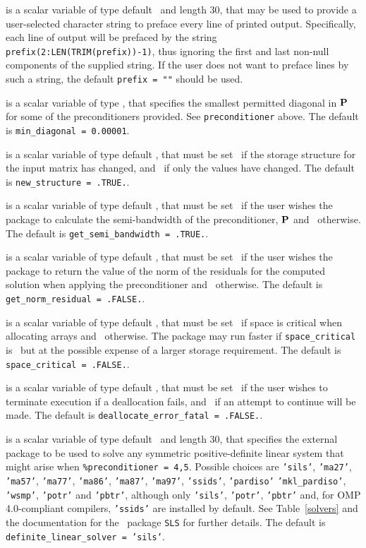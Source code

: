 \documentclass{galahad}
\begin{document}
\begin{description}
 is a scalar variable of type default \character\
and length 30, that may be used to provide a user-selected
character string to preface every line of printed output.
Specifically, each line of output will be prefaced by the string
{\tt prefix(2:LEN(TRIM(prefix))-1)},
thus ignoring the first and last non-null components of the
supplied string. If the user does not want to preface lines by such
a string, the default {\tt prefix = ""} should be used.

 is a scalar variable of type \realdp,
that specifies the smallest permitted diagonal in ${\mathbf{P}}$ for some
of the preconditioners provided. See {\tt preconditioner} above.
The default is {\tt min\_diagonal = 0.00001}.

 is a scalar variable of type default \logical,
that must be set \true\ if the storage structure for the input matrix has
changed, and \false\ if only the values have changed.
The default is {\tt new\_structure = .TRUE.}.

 is a scalar variable of type default \logical,
that must be set \true\ if the user wishes the package to calculate
the semi-bandwidth of the preconditioner, ${\mathbf{P}}$
and  \false\ otherwise.
The default is {\tt get\_semi\_bandwidth = .TRUE.}.

 is a scalar variable of type default \logical,
that must be set \true\ if the user wishes the package to return
the value of the norm of the residuals for the computed solution
when applying the preconditioner and  \false\ otherwise.
The default is {\tt get\_norm\_residual = .FALSE.}.

 is a scalar variable of type default \logical,
that must be set \true\ if space is critical when allocating arrays
and  \false\ otherwise. The package may run faster if
{\tt space\_critical} is \false\ but at the possible expense of a larger
storage requirement. The default is {\tt space\_critical = .FALSE.}.

 is a scalar variable of type default \logical,
that must be set \true\ if the user wishes to terminate execution if
a deallocation  fails, and \false\ if an attempt to continue
will be made. The default is {\tt deallocate\_error\_fatal = .FALSE.}.

 is a scalar variable of type default \character\
and length 30, that specifies the external package to be used to
solve any symmetric positive-definite linear system that might arise
when {\tt \%precondit\-ioner = 4,5}. Possible choices are
{\tt 'sils'},
{\tt 'ma27'},
{\tt 'ma57'},
{\tt 'ma77'},
{\tt 'ma86'},
{\tt 'ma87'},
{\tt 'ma97'},
{\tt 'ssids'},
{\tt 'pardiso'}
{\tt 'mkl\_pardiso'},
{\tt 'wsmp'},
{\tt 'potr'} and
{\tt 'pbtr'},
although only {\tt 'sils'}, {\tt 'potr'}, {\tt 'pbtr'}
and, for OMP 4.0-compliant compilers,
{\tt 'ssids'} are installed by default.
See Table~\ref{solvers} and
the documentation for the \galahad\ package {\tt SLS} for further details.
The default is {\tt definite\_linear\_solver = 'sils'}.


\end{description}
\end{document}
